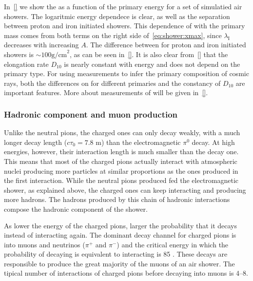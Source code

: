 In~\cref{} we show the \xmaxmean as a function of the primary energy
for a set of simulatied air showers. The logaritmic energy dependece is clear,
as well as the separation between proton and iron initiated showers.
This dependence of \xmaxmean with the primary mass comes from both terms
on the right side of~\cref{eq:shower:xmax}, since $\lambda_\text{I}$
decreases with increasing $A$. The difference between \xmaxmean for
proton and iron initiated showers is $\sim 100 \text{g/cm}^2$, as can
be seen in~\cref{}. It is also clear from~\cref{} that the elongation rate
$D_{10}$ is nearly constant with energy and does not depend on the primary type.
For using \xmax measurements to infer the primary composition of
cosmic rays, both the differences on \xmax for different primaries and
the constancy of $D_{10}$ are important features. More about measurements
of \xmax will be given in~\cref{}. 


\subsubsection{Hadronic component and muon production}
\label{sec:showers:phen:had}

Unlike the neutral pions, the charged ones can only decay weakly,
with a much longer decay length ($c\tau_0=7.8$ m)
than the electromagnetic $\pi^0$ decay.  
At high energies, however, their interaction length
is much smaller than the decay one. This means that most
of the charged pions actually interact with atmospheric nuclei
producing more particles at similar proportions as the ones produced
in the first interaction. While the neutral pions produced
fed the electromagnetic shower, as explained above, the charged ones
can keep interacting and producing more hadrons. The hadrons
produced by this chain of hadronic interactions compose the
hadronic component of the shower.

As lower the energy of the charged pions, larger the probability
that it decays instead of interacting again. The dominant decay channel
for charged pions is into muons and neutrinos ($\pi^+$ and $\pi^-$)
and the critical energy in which the probability of decaying is
equivalent to interacting is 85 \GeV. These decays are responsible
to produce the great majority of the muons of an air shower.
The tipical number of interactions of charged pions before
decaying into muons is 4--8. 


